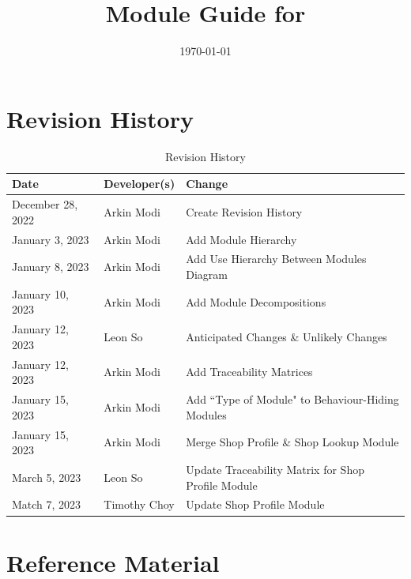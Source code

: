 \documentclass[12pt, titlepage]{article}
\begin{document}
\title{Module Guide for \progname{}}
\author{\authname}
\date{\today}

\maketitle


\section{Revision History}

\begin{table}[hp]
	\caption{Revision History} \label{TblRevisionHistory}
	\begin{tabularx}{\textwidth}{llX}
		\toprule
		\textbf{Date}     & \textbf{Developer(s)} & \textbf{Change}                                    \\
		\midrule
		December 28, 2022 & Arkin Modi            & Create Revision History                            \\
		January 3, 2023   & Arkin Modi            & Add Module Hierarchy                               \\
		January 8, 2023   & Arkin Modi            & Add Use Hierarchy Between Modules Diagram          \\
		January 10, 2023  & Arkin Modi            & Add Module Decompositions                          \\
		January 12, 2023  & Leon So               & Anticipated Changes \& Unlikely Changes            \\
		January 12, 2023  & Arkin Modi            & Add Traceability Matrices                          \\
		January 15, 2023  & Arkin Modi            & Add ``Type of Module" to Behaviour-Hiding Modules  \\
		January 15, 2023  & Arkin Modi            & Merge Shop Profile \& Shop Lookup Module           \\
		March 5, 2023     & Leon So               & Update Traceability Matrix for Shop Profile Module \\
		Match 7, 2023     & Timothy Choy          & Update Shop Profile Module                         \\
		\bottomrule
	\end{tabularx}
\end{table}

\newpage

\section{Reference Material}
\end{document}
